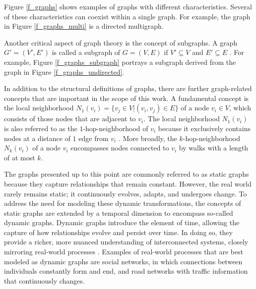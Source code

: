 Figure \ref{f_graphs} shows examples of graphs with different characteristics. Several of these characteristics can coexist within a single graph. For example, the graph in Figure \ref{f_graphs_multi} is a directed multigraph.

Another critical aspect of graph theory is the concept of subgraphs. A graph $G' = (V', E')$ is called a subgraph of $G = (V,E)$ if $V' \subseteq V$ and $E' \subseteq E$ \cite{diestel_graph_2017}. For example, Figure \ref{f_graphs_subgraph} portrays a subgraph derived from the graph in Figure \ref{f_graphs_undirected}. 

In addition to the structural definitions of graphs, there are further graph-related concepts that are important in the scope of this work. A fundamental concept is the local neighborhood $N_1(v_i) = \{v_j \in V | (v_i, v_j) \in E\}$ of a node $v_i \in V$, which consists of those nodes that are adjacent to $v_i$.
The local neighborhood $N_1(v_i)$ is also referred to as the $1$-hop-neighborhood of $v_i$ because it exclusively contains nodes at a distance of $1$ edge from $v_i$ \cite{bronstein_geometric_2021}. More broadly, the $k$-hop-neighborhood $N_k(v_i)$ of a node $v_i$ encompasses nodes connected to $v_i$ by walks with a length of at most $k$. 



The graphs presented up to this point are commonly referred to as static graphs \cite{kazemi_representation_2019, rossi_temporal_2020, you_roland_2022} because they capture relationships that remain constant. However, the real world rarely remains static; it continuously evolves, adapts, and undergoes change. To address the need for modeling these dynamic transformations, the concepts of static graphs are extended by a temporal dimension to encompass so-called dynamic graphs. Dynamic graphs introduce the element of time, allowing the capture of how relationships evolve and persist over time. In doing so, they provide a richer, more nuanced understanding of interconnected systems, closely mirroring real-world processes \cite{you_roland_2022, xu_inductive_2020, trivedi_dyrep_2019}. Examples of real-world processes that are best modeled as dynamic graphs are social networks, in which connections between individuals constantly form and end, and road networks with traffic information that continuously changes.


